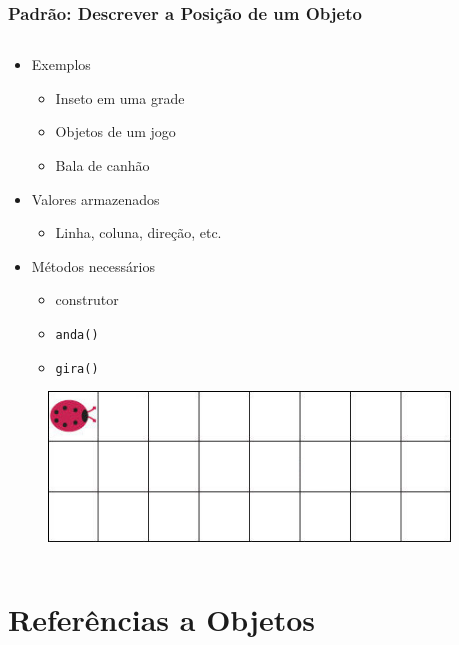 \documentclass[xcolor={dvipsnames,table},aspectratio=169]{beamer}
\begin{document}
\begin{frame}[fragile]\frametitle{Padrão: Descrever a Posição de um Objeto}
\begin{columns}[T]
	\begin{column}{0.5\linewidth}
\begin{itemize}
	\item Exemplos
	\begin{itemize}
		\item Inseto em uma grade
		\item Objetos de um jogo
		\item Bala de canhão
	\end{itemize}
	\item Valores armazenados
	\begin{itemize}
		\item Linha, coluna, direção, etc.
	\end{itemize}
	\item Métodos necessários
	\begin{itemize}
		\item construtor
		\item \texttt{anda()}
		\item \texttt{gira()}
	\end{itemize}
\end{itemize}
\begin{figure}[h]
	\includegraphics[height=0.15\paperheight,center]{pucrs-ep-fprog-unidade_07-objetos_e_classes-laminas-inseto.jpg}
\end{figure}
	\end{column}
	\begin{column}{0.5\linewidth}
{\tiny\inputminted[bgcolor=cyan!10]{java}{src/Inseto.java}}
	\end{column}
\end{columns}
\end{frame}

\section{Referências a Objetos}
\end{document}
